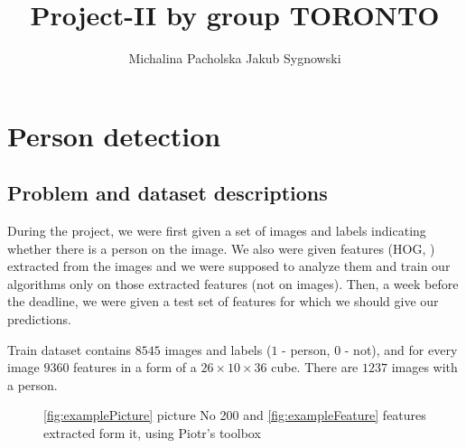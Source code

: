 \documentclass[]{report}
\title{Project-II by group TORONTO}
\author{Michalina Pacholska \And Jakub Sygnowski}
\newcommand{\mychapter}[2]{
    \setcounter{chapter}{#1}
    \setcounter{section}{0}
    \chapter*{#2}
}
\begin{document}
\begingroup
\renewcommand{\cleardoublepage}{}
\renewcommand{\clearpage}{}
\mychapter{1}{Person detection}
\endgroup

\section{Problem and dataset descriptions}
  During the project, we were first given a set of images and labels indicating whether there is a person on the image. We also were given features (HOG, \cite{hog}) extracted from the images and we were supposed to analyze them and train our algorithms only on those extracted features (not on images). Then, a week before the deadline, we were given a test set of features for which we should give our predictions. 

  Train dataset contains $8545$ images and labels ($1$ - person, $0$ - not), and for every image $9360$ features in a form of a $26\times10\times36$ cube. There are $1237$ images with a person.

\begin{figure}[!h]
  \center
  \;
  \caption{ \ref{fig:examplePicture} picture No 200 and \ref{fig:exampleFeature} features extracted form it, using Piotr's toolbox \cite{piotr}
  }
\end{figure}
\end{document}
